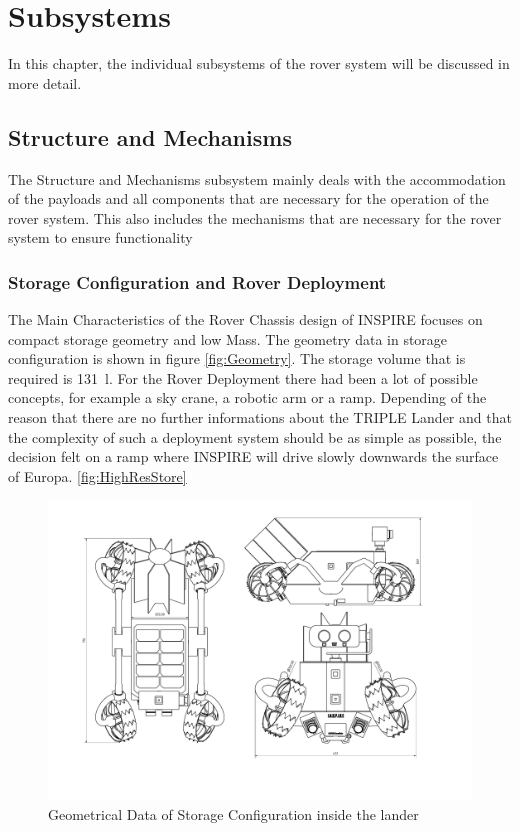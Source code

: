 \chapter{Subsystems}
\label{chap:subsystems}

In this chapter, the individual subsystems of the rover system will be discussed in more detail.

\section{Structure and Mechanisms}
\label{sec:mechanics}

The Structure and Mechanisms subsystem mainly deals with the accommodation of the payloads and all components that are necessary for the operation of the rover system. This also includes the mechanisms that are necessary for the rover system to ensure functionality 

\subsection{Storage Configuration and Rover Deployment}

The Main Characteristics of the Rover Chassis design of INSPIRE focuses on compact storage geometry and low Mass. 
The geometry data in storage configuration is shown in figure \autoref{fig:Geometry}.
The storage volume that is required is 131~l.
For the Rover Deployment there had been a lot of possible concepts, for example a sky crane, a robotic arm or a ramp. Depending of the reason that there are no further informations about the TRIPLE Lander and that the complexity of such a deployment system should be as simple as possible, the decision felt on a ramp where INSPIRE will drive slowly downwards the surface of Europa. 
\autoref{fig:HighResStore}

\begin{figure}[htb]
     \centering
     \includegraphics[width=\textwidth]{Media/INSPIRE_blackwhite.pdf}
     \caption{Geometrical Data of Storage Configuration inside the lander}
     \label{fig:Geometry}
\end{figure}

